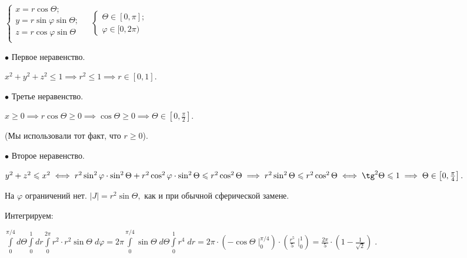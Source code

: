 \documentclass[a4paper, fleqn]{article}
\begin{document}
    $\begin{cases}
    x = r \cos \Theta;\\
    y = r \sin  \varphi \sin  \Theta;\\
    z = r \cos  \varphi \sin  \Theta \\
    \end{cases} \; \; \; \; 
    \begin{cases}
    \Theta \in [0,\pi];\\
    \varphi \in [0, 2 \pi)
    \end{cases}$
    
    $\bullet$ Первое неравенство.
    
    $x^2 + y^2 + z^2 \leq 1 \implies r^2 \leq 1 \implies r \in [0,1].$
    
    $\bullet$ Третье неравенство.
    
    $x \geq 0 \implies r \cos \Theta \geq 0 \implies \cos \Theta \geq 0 \implies \Theta \in \left[0, \frac{\pi}{2}\right]. $
    
    (Мы использовали тот факт, что $r \geq 0$).
    
    $\bullet$ Второе неравенство.
    
    $y^2 + z^2 \leq x^2 \iff
    r^2 \sin^2  \varphi \cdot \sin^2  \Theta +
    r^2 \cos^2  \varphi \cdot  \sin^2  \Theta \leq 
    r^2 \cos^2 \Theta \implies r^2 \sin^2 \Theta \leq r^2 \cos^2 \Theta \iff \tg^2 \Theta \leq 1 \implies \Theta \in \left[ 0, \frac{\pi}{4} \right].$
    
    На $\varphi$ ограничений нет. $|J| = r^2 \sin \Theta,$ как и при обычной сферической замене.
    
    Интегрируем:
    
    $\displaystyle \int \limits_{0}^{\pi /4} d\Theta  \int \limits_{0}^{1} dr  \int \limits_{0}^{2 \pi}   r^2 \cdot r^2 \sin \Theta \; d \varphi  = 2 \pi \int \limits_{0}^{\pi /4} \sin \Theta \;  d\Theta  \int \limits_{0}^{1}  r^4   \; dr = 2 \pi \cdot  \left( -\cos \Theta \;  \Bigg|_{0}^{\pi /4} \right) \cdot \left( \frac{r^5}{5} \; \Bigg|_0^1 \right) = \boxed{\frac{2\pi}{5} \cdot \left(1 - \frac{1}{\sqrt{2}} \right)} \; .$
    
    
    
    
    
\end{document}
